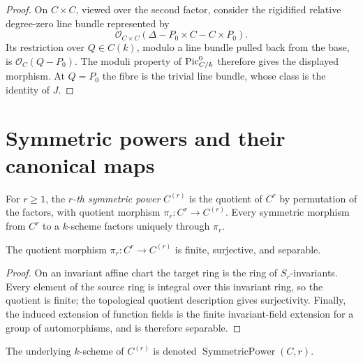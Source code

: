 \begin{proof}
  On \(C\times C\), viewed over the second factor, consider the
  rigidified relative degree-zero line bundle represented by
  \[
    \mathcal O_{C\times C}
      (\Delta-P_0\times C-C\times P_0).
  \]
  Its restriction over \(Q\in C(k)\), modulo a line bundle pulled back
  from the base, is \(\mathcal O_C(Q-P_0)\).  The moduli property of
  \(\operatorname{Pic}^0_{C/k}\) therefore gives the displayed morphism.  At \(Q=P_0\)
  the fibre is the trivial line bundle, whose class is the identity of
  \(J\).
\end{proof}

\section{Symmetric powers and their canonical maps}
\label{sec:albaneseup_symmetric_powers}

\begin{definition}
  \label{def:symmetric_power_curve}

  For \(r\ge 1\), the \emph{\(r\)-th symmetric power} \(C^{(r)}\) is the
  quotient of \(C^r\) by permutation of the factors, with quotient morphism
  \(\pi_r\colon C^r\to C^{(r)}\).  Every symmetric morphism from \(C^r\) to a
  \(k\)-scheme factors uniquely through \(\pi_r\).
\end{definition}

\begin{lemma}
  \label{lem:symmetric_power_projection_properties}

  The quotient morphism \(\pi_r\colon C^r\to C^{(r)}\) is finite,
  surjective, and separable.
\end{lemma}

\begin{proof}
  On an invariant affine chart the target ring is the ring of
  \(S_r\)-invariants.  Every element of the source ring is integral over this
  invariant ring, so the quotient is finite; the topological quotient
  description gives surjectivity.  Finally, the induced extension of
  function fields is the finite invariant-field extension for a group of
  automorphisms, and is therefore separable.
\end{proof}

\begin{definition}
  \label{def:symmetric_power_curve_carrier}

  The underlying \(k\)-scheme of \(C^{(r)}\) is denoted
  \(\operatorname{SymmetricPower}(C,r)\).
\end{definition}

